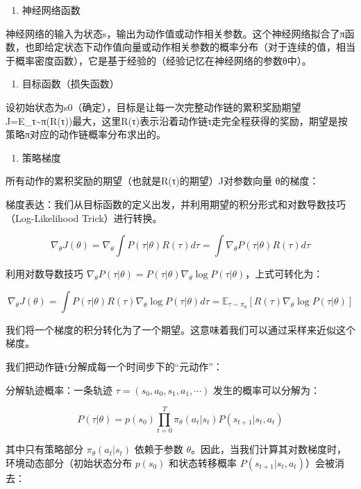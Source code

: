 \begin{enumerate}
\def\labelenumi{\arabic{enumi}.}
\setcounter{enumi}{1}
\tightlist
\item
  神经网络函数
\end{enumerate}

神经网络的输入为状态s，输出为动作值或动作相关参数。这个神经网络拟合了π函数，也即给定状态下动作值向量或动作相关参数的概率分布（对于连续的值，相当于概率密度函数），它是基于经验的（经验记忆在神经网络的参数θ中）。

\begin{enumerate}
\def\labelenumi{\arabic{enumi}.}
\setcounter{enumi}{2}
\tightlist
\item
  目标函数（损失函数）
\end{enumerate}

设初始状态为s0（确定），目标是让每一次完整动作链的累积奖励期望J=E\_τ\textasciitilde π(R(τ))最大，这里R(τ)表示沿着动作链τ走完全程获得的奖励，期望是按策略π对应的动作链概率分布求出的。

\begin{enumerate}
\def\labelenumi{\arabic{enumi}.}
\setcounter{enumi}{3}
\tightlist
\item
  策略梯度
\end{enumerate}

所有动作的累积奖励的期望（也就是R(τ)的期望）J对参数向量 θ的梯度：

梯度表达：我们从目标函数的定义出发，并利用期望的积分形式和对数导数技巧（Log-Likelihood Trick）进行转换。

\[
\nabla_\theta J(\theta)
=\nabla_\theta\int P(\tau|\theta)R(\tau)d\tau
=\int\nabla_\theta P(\tau|\theta)R(\tau)d\tau
\]

利用对数导数技巧 \(\nabla_\theta P(\tau|\theta)=P(\tau|\theta)\nabla_\theta\log P(\tau|\theta)\)，上式可转化为：

\[
\nabla_\theta J(\theta)
=\int P(\tau|\theta)R(\tau)\nabla_\theta\log P(\tau|\theta)d\tau
=\mathbb{E}_{\tau\sim\pi_\theta}\left[R(\tau)\nabla_\theta\log P(\tau|\theta)\right]
\]

我们将一个梯度的积分转化为了一个期望。这意味着我们可以通过采样来近似这个梯度。

我们把动作链τ分解成每一个时间步下的``元动作''：

分解轨迹概率：一条轨迹 \(\tau=(s_0,a_0,s_1,a_1,\cdots)\) 发生的概率可以分解为：

\[
P(\tau|\theta)=p(s_0)\prod_{t=0}^{T}\pi_\theta(a_t|s_t)P(s_{t+1}|s_t,a_t)
\]

其中只有策略部分 \(\pi_\theta(a_t|s_t)\) 依赖于参数 \(\theta\)。因此，当我们计算其对数梯度时，环境动态部分（初始状态分布 \(p(s_0)\) 和状态转移概率 \(P(s_{t+1}|s_t,a_t)\)）会被消去：

